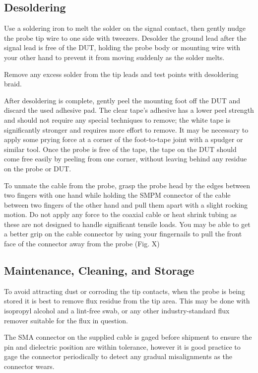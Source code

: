 \documentclass[11pt]{article}
\begin{document}
\subsection{Desoldering}

Use a soldering iron to melt the solder on the signal contact, then gently nudge the probe tip wire to one side with
tweezers. Desolder the ground lead after the signal lead is free of the DUT, holding the probe body or mounting wire
with your other hand to prevent it from moving suddenly as the solder melts.

Remove any excess solder from the tip leads and test points with desoldering braid.

After desoldering is complete, gently peel the mounting foot off the DUT and discard the used adhesive pad. The clear
tape's adhesive has a lower peel strength and should not require any special techniques to remove; the white tape is
significantly stronger and requires more effort to remove. It may be necessary to apply some prying force at a corner
of the foot-to-tape joint with a spudger or similar tool. Once the probe is free of the tape, the tape on the DUT
should come free easily by peeling from one corner, without leaving behind any residue on the probe or DUT.

To unmate the cable from the probe, grasp the probe head by the edges between two fingers with one hand while holding
the SMPM connector of the cable between two fingers of the other hand and pull them apart with a slight rocking motion.
Do not apply any force to the coaxial cable or heat shrink tubing as these are not designed to handle significant
tensile loads. You may be able to get a better grip on the cable connector by using your fingernails to pull the front
face of the connector away from the probe (Fig. X)

\subsection{Maintenance, Cleaning, and Storage}

To avoid attracting dust or corroding the tip contacts, when the probe is being stored it is best to remove flux
residue from the tip area. This may be done with isopropyl alcohol and a lint-free swab, or any other industry-standard
flux remover suitable for the flux in question.

The SMA connector on the supplied cable is gaged before shipment to ensure the pin and dielectric position are within
tolerance, however it is good practice to gage the connector periodically to detect any gradual misalignments as the
connector wears.
\end{document}

